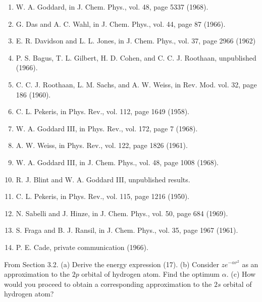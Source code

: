\begin{enumerate}
\item W. A. Goddard, in J. Chem. Phys., vol. 48, page 5337 (1968).

\item G. Das and A. C. Wahl, in J. Chem. Phys., vol. 44, page 87 (1966).

\item E. R. Davidson and L. L. Jones, in J. Chem. Phys., vol. 37, page 2966 
(1962)

\item P. S. Bagus, T. L. Gilbert, H. D. Cohen, and C. C. J. Roothaan, 
unpublished (1966).

\item C. C. J. Roothaan, L. M. Sachs, and A. W. Weiss, in Rev. Mod. vol. 32,
page 186 (1960).

\item C. L. Pekeris, in Phys. Rev., vol. 112, page 1649 (1958).

\item W. A. Goddard III, in Phys. Rev., vol. 172, page 7 (1968).

\item A. W. Weiss, in Phys. Rev., vol. 122, page 1826 (1961).

\item W. A. Goddard III, in J. Chem. Phys., vol. 48, page 1008 (1968).

\item R. J. Blint and W. A. Goddard III, unpublished results.

\item C. L. Pekeris, in Phys. Rev., vol. 115, page 1216 (1950).

\item N. Sabelli and J. Hinze, in J. Chem. Phys., vol. 50, page 684 (1969).

\item S. Fraga and B. J. Ransil, in J. Chem. Phys., vol. 35, page 1967 (1961).

\item P. E. Cade, private communication (1966).
\end{enumerate}


From Section 3.2. (a) Derive the energy expression (17). (b) Consider 
$ze^{-\alpha r^2}$ as an approximation to the $2p$ orbital of hydrogen 
atom.  Find the optimum $\alpha$.  (c)  How would you proceed to obtain a 
corresponding approximation to the $2s$ orbital of hydrogen atom?



